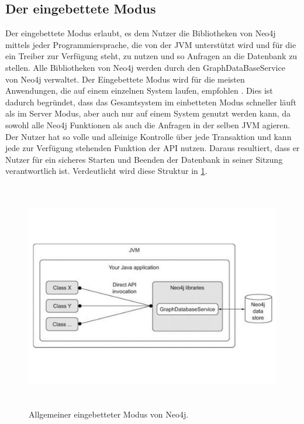 \subsection{Der eingebettete Modus}
Der eingebettete Modus erlaubt, es dem Nutzer die  Bibliotheken von Neo4j mittels jeder Programmiersprache, die von der JVM unterstützt wird und für die ein Treiber zur Verfügung steht, zu nutzen und so Anfragen an die Datenbank zu stellen. Alle Bibliotheken von Neo4j werden durch den GraphDataBaseService von Neo4j verwaltet. Der Eingebettete Modus wird für die meisten Anwendungen, die auf einem einzelnen System laufen, empfohlen \parencite{raj2015neo4j}. Dies ist dadurch begründet, dass das Gesamtsystem im einbetteten Modus schneller läuft als im Server Modus, aber auch nur auf einem System genutzt werden kann, da sowohl alle Neo4j Funktionen als auch die Anfragen in der selben JVM agieren. Der Nutzer hat so volle und alleinige Kontrolle über jede Transaktion und kann jede zur Verfügung stehenden Funktion der API nutzen. Daraus resultiert, dass er Nutzer für ein sicheres Starten und Beenden der Datenbank in seiner Sitzung verantwortlich ist\parencite{robinson2013graph}.  Verdeutlicht wird diese Struktur in \ref{fig:Embedded}.
\begin{figure}[!htb]
	\centering
	\includegraphics [width=12cm, height=10cm]{Figures/Embedded}
	\caption[Eingebettet]{Allgemeiner eingebetteter Modus von Neo4j.}
	\label{fig:Embedded}
	\FloatBarrier
\end{figure}

